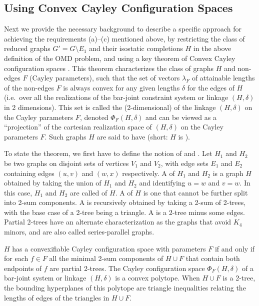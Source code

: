 \subsection{Using Convex Cayley Configuration Spaces}
\label{sec:2-tree-reduction}
%
Next we provide the necessary background to describe a specific approach for achieving the requirements (a)--(c) mentioned above, by restricting the class of reduced graphs $G' = G\setminus E_1$ and their isostatic completions $H$ in the above definition of the OMD problem, and using a key theorem of Convex Cayley configuration spaces \cite{sitharam2010convex}. This theorem characterizes the class of graphs $H$ and non-edges $F$ (Cayley parameters), such that the set of vectors $\lambda_F$ of  attainable lengths of the non-edges $F$ is always convex for any given lengths $\delta$ for the edges of $H$ (i.e.\ over all the realizations of the bar-joint constraint system or linkage $(H,\delta)$ in 2 dimensions). This set is called the (2-dimensional)  of the linkage $(H,\delta)$ on the Cayley parameters $F$, denoted $\Phi_F(H,\delta)$ and can be viewed as a ``projection'' of the cartesian realization space of $(H,\delta)$ on the Cayley parameters $F$. Such graphs $H$ are said to have  (short: $H$ is ).

To state the theorem, we first have to define the notion of  and . Let $H_1$ and $H_2$ be two graphs on disjoint sets of vertices $V_1$ and $V_2$, with edge sets $E_1$ and $E_2$ containing edges $(u,v)$ and $(w,x)$ respectively.
A  of $H_1$ and $H_2$ is a graph $H$ obtained by taking the union of $H_1$ and $H_2$ and identifying $u=w$ and $v=w$. In this case, $H_1$ and $H_2$ are called  of $H$. A  of $H$ is  one that cannot be further split into 2-sum components. A  is recursively obtained by taking a 2-sum of 2-trees, with the base case of a 2-tree being a triangle. A  is a 2-tree minus some edges. Partial 2-trees have an alternate characterization as the graphs that avoid $K_4$ minors, and are also called series-parallel graphs.

\begin{theorem}\label{theorem:convexcayley}
    \cite{sitharam2010convex} $H$ has a convexifiable Cayley configuration space  with parameters $F$ if and only if for each $f\in F$  all the minimal 2-sum components of $H\cup F$ that contain both endpoints of $f$ are partial 2-trees. The Cayley configuration space $\Phi_F(H,\delta)$ of a bar-joint system or linkage $(H,\delta)$ is a convex polytope. When $H\cup F$ is a 2-tree, the bounding hyperplanes of this polytope are triangle inequalities relating the lengths of edges of the triangles in $H\cup F$.
\end{theorem}

